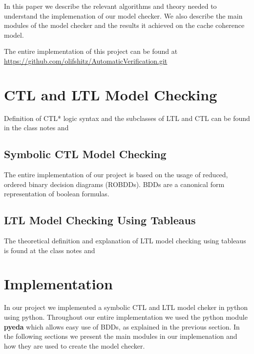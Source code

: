 \documentclass[11pt]{article}
\begin{document}
   In this paper we describe the relevant algorithms and theory needed to
   understand the implemenation of our model checker. We also describe the 
   main modules of the model checker and the results it achieved on the 
   cache coherence model.

   The entire implementation of this project can be found at \url{https://github.com/olifshitz/AutomaticVerification.git}

\section{CTL and LTL Model Checking}

   Definition of CTL* logic syntax and the subclasses of LTL and CTL can be found in the class notes and \cite{ltl}


    \subsection{Symbolic CTL Model Checking}
        The entire implementation of our project is based on the usage of reduced, ordered 
        binary decision diagrams (ROBDDs). BDDs are a canonical form representation of
        boolean formulas\cite{bdd}.

    \subsection{LTL Model Checking Using Tableaus}
        The theoretical definition and explanation of LTL model checking using tableaus is found at the class notes and \cite{ltl}

\section{Implementation}
    In our project we implemented a symbolic CTL and LTL model cheker in python 
    using python. Throughout our entire implementation we used the python module
    \textbf{pyeda} which allows easy use of BDDs, as explained in the previous section.
    In the following sections we present the main modules in our implemenation and how
    they are used to create the model checker.
\end{document}
